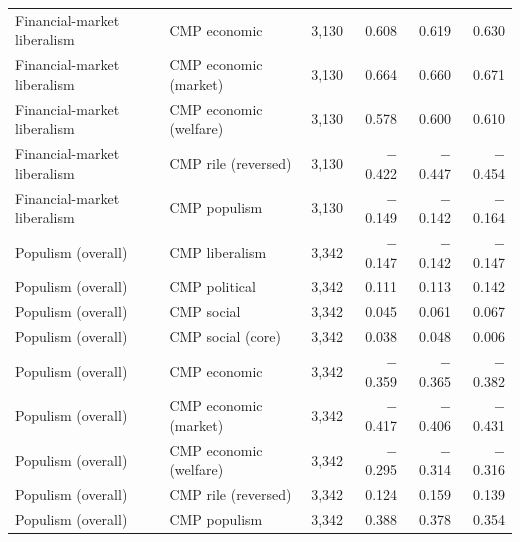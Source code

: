 \begin{table}[ht]
{\begin{tabular}{llrrrr}
Financial-market liberalism & CMP economic & 3,130 & 0.608 & 0.619 & 0.630 \\
Financial-market liberalism & CMP economic (market) & 3,130 & 0.664 & 0.660 & 0.671 \\
Financial-market liberalism & CMP economic (welfare) & 3,130 & 0.578 & 0.600 & 0.610 \\
Financial-market liberalism & CMP rile (reversed) & 3,130 & $-$0.422 & $-$0.447 & $-$0.454 \\
Financial-market liberalism & CMP populism & 3,130 & $-$0.149 & $-$0.142 & $-$0.164 \\
Populism (overall) & CMP liberalism & 3,342 & $-$0.147 & $-$0.142 & $-$0.147 \\
Populism (overall) & CMP political & 3,342 & 0.111 & 0.113 & 0.142 \\
Populism (overall) & CMP social & 3,342 & 0.045 & 0.061 & 0.067 \\
Populism (overall) & CMP social (core) & 3,342 & 0.038 & 0.048 & 0.006 \\
Populism (overall) & CMP economic & 3,342 & $-$0.359 & $-$0.365 & $-$0.382 \\
Populism (overall) & CMP economic (market) & 3,342 & $-$0.417 & $-$0.406 & $-$0.431 \\
Populism (overall) & CMP economic (welfare) & 3,342 & $-$0.295 & $-$0.314 & $-$0.316 \\
Populism (overall) & CMP rile (reversed) & 3,342 & 0.124 & 0.159 & 0.139 \\
Populism (overall) & CMP populism & 3,342 & 0.388 & 0.378 & 0.354 \\
\bottomrule
\end{tabular}}
\end{table}
